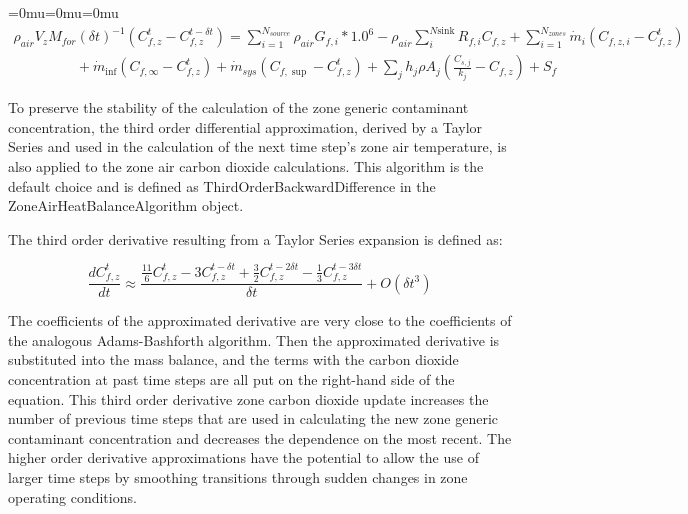{\medmuskip=0mu\thinmuskip=0mu\thickmuskip=0mu\nulldelimiterspace=0pt\scriptspace=0pt
\begin{equation}
\begin{array}{l}{\rho_{air}}{V_z}{M_{for}}{\left( {\delta t} \right)^{ - 1}}\left( {C_{f,z}^t - C_{f,z}^{t - \delta t}} \right) = \sum\limits_{i = 1}^{{N_{source}}} {{\rho_{air}}{G_{f,i}}*{{1.0}^6} - } {\rho_{air}}\sum\limits_i^{N{\mathrm{sink}}} {{R_{f,i}}{C_{f,z}}}  + \sum\limits_{i = 1}^{{N_{zones}}} {{{\dot m}_i}} \left( {{C_{f,z,i}} - C_{f,z}^t} \right)\;\\\;\;\;\;\;\;\;\;\;\;\;\;\;\;\;\; + {{\dot m}_{\inf }}\left( {{C_{f,\infty }} - C_{f,z}^t} \right) + {{\dot m}_{sys}}\left( {{C_{f,\sup }} - C_{f,z}^t} \right) + \sum\limits_j {{h_j}\rho {A_j}(\frac{{{C_{s,j}}}}{{{k_j}}} - {C_{f,z}})}  + {S_f}\end{array}
\end{equation}}

To preserve the stability of the calculation of the zone generic contaminant concentration, the third order differential approximation, derived by a Taylor Series and used in the calculation of the next time step's zone air temperature, is also applied to the zone air carbon dioxide calculations. This algorithm is the default choice and is defined as ThirdOrderBackwardDifference in the ZoneAirHeatBalanceAlgorithm object.

The third order derivative resulting from a Taylor Series expansion is defined as:

\begin{equation}
\frac{{dC_{f,z}^t}}{{dt}} \approx \frac{{\frac{{11}}{6}C_{f,z}^t - 3C_{f,z}^{t - \delta t} + \frac{3}{2}C_{f,z}^{t - 2\delta t} - \frac{1}{3}C_{f,z}^{t - 3\delta t}}}{{\delta t}} + O(\delta {t^3})
\end{equation}

The coefficients of the approximated derivative are very close to the coefficients of the analogous Adams-Bashforth algorithm. Then the approximated derivative is substituted into the mass balance, and the terms with the carbon dioxide concentration at past time steps are all put on the right-hand side of the equation. This third order derivative zone carbon dioxide update increases the number of previous time steps that are used in calculating the new zone generic contaminant concentration and decreases the dependence on the most recent. The higher order derivative approximations have the potential to allow the use of larger time steps by smoothing transitions through sudden changes in zone operating conditions.

